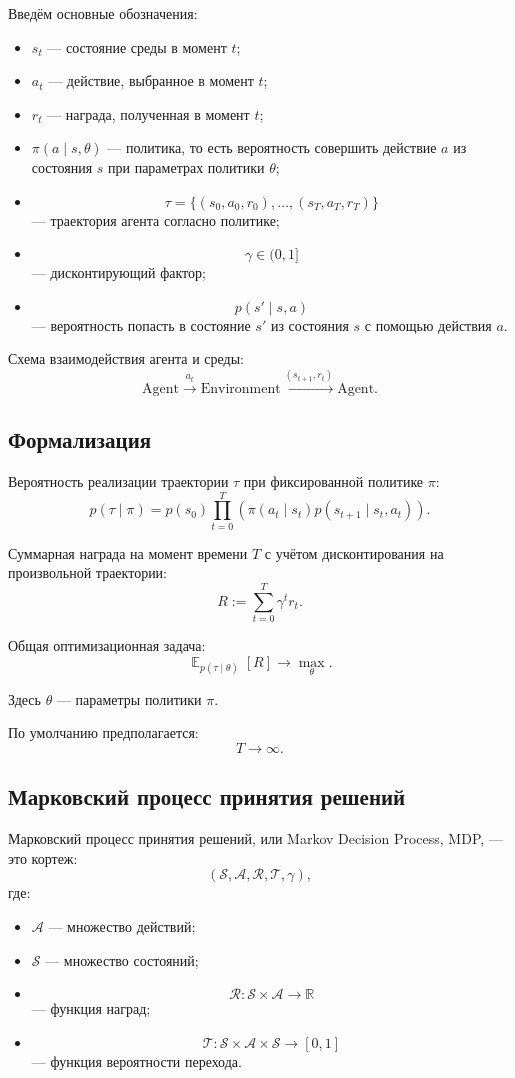 \documentclass[12pt,a4paper]{article}
\DeclareMathOperator{\E}{\mathbb E}
\begin{document}
Введём основные обозначения:
\begin{itemize}
    \item $s_t$ --- состояние среды в момент $t$;
    \item $a_t$ --- действие, выбранное в момент $t$;
    \item $r_t$ --- награда, полученная в момент $t$;
    \item $\pi(a \mid s,\theta)$ --- политика, то есть вероятность совершить действие $a$ из состояния $s$ при параметрах политики $\theta$;
    \item
    \[
    \tau =
    \{(s_0,a_0,r_0),\ldots,(s_T,a_T,r_T)\}
    \]
    --- траектория агента согласно политике;
    \item
    \[
    \gamma \in (0,1]
    \]
    --- дисконтирующий фактор;
    \item
    \[
    p(s' \mid s,a)
    \]
    --- вероятность попасть в состояние $s'$ из состояния $s$ с помощью действия $a$.
\end{itemize}

Схема взаимодействия агента и среды:
\[
\text{Agent}
\xrightarrow{a_t}
\text{Environment}
\xrightarrow{(s_{t+1},r_t)}
\text{Agent}.
\]

\subsection{Формализация}

Вероятность реализации траектории $\tau$ при фиксированной политике $\pi$:
\[
p(\tau \mid \pi)
=
p(s_0)
\prod_{t=0}^{T}
\left(
\pi(a_t \mid s_t)
p(s_{t+1}\mid s_t,a_t)
\right).
\]

Суммарная награда на момент времени $T$ с учётом дисконтирования на произвольной траектории:
\[
R
:=
\sum_{t=0}^{T}
\gamma^t r_t.
\]

Общая оптимизационная задача:
\[
\E_{p(\tau \mid \theta)}
\left[
R
\right]
\to
\max_{\theta}.
\]

Здесь $\theta$ --- параметры политики $\pi$.

По умолчанию предполагается:
\[
T \to \infty.
\]

\subsection{Марковский процесс принятия решений}

Марковский процесс принятия решений, или Markov Decision Process, MDP, --- это кортеж:
\[
(\mathcal S,\mathcal A,\mathcal R,\mathcal T,\gamma),
\]
где:
\begin{itemize}
    \item $\mathcal A$ --- множество действий;
    \item $\mathcal S$ --- множество состояний;
    \item
    \[
    \mathcal R : \mathcal S \times \mathcal A \to \mathbb R
    \]
    --- функция наград;
    \item
    \[
    \mathcal T : \mathcal S \times \mathcal A \times \mathcal S \to [0,1]
    \]
    --- функция вероятности перехода.
\end{itemize}
\end{document}
